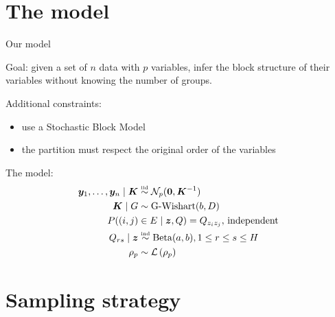 
\section{The model}


\begin{frame}{Our model}

\alert{Goal}: given a set of $n$ data with $p$ variables, infer the block structure of their variables
without knowing the number of groups.

\pause

\alert{Additional constraints}: 
\begin{itemize}
    \item use a Stochastic Block Model    
    \item the partition must respect the original order of the variables
\end{itemize} 

\pause

\alert{The model}: 
\begin{align*}
    \bm{y}_1, \ldots, \bm{y}_n \mid \bm{K} & \overset{\text{\tiny{iid}}}{\sim} \mathcal{N}_p(\mathbf{0}, \bm{K}^{-1} ) \\
    \bm{K} \mid G & \sim \operatorname{G-Wishart}(b, D)\\
    P((i,j)&\in E\mid \bm{z},Q) = Q_{z_{i} z_{j}},\,\text{independent}\\
        Q_{rs} \mid \bm{z} &\overset{\text{\tiny{ind}}}{\sim} \operatorname{Beta}(a,b), 1\leq r\leq s\leq H\\
    \rho_p & \sim \mathcal{L}\left(\rho_p\right)
\end{align*}


\end{frame}


\section{Sampling strategy}


